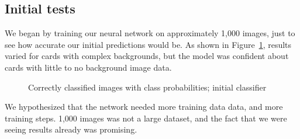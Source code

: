 \documentclass[letterpaper]{article}
\begin{document}
\subsection{Initial tests}
We began by training our neural network on approximately 1,000 images, just to see how accurate our initial predictions would be. As shown in Figure~\ref{fig:initial_results_1}, results varied for cards with complex backgrounds, but the model was confident about cards with little to no background image data. 
\begin{figure}[!tbp]
  \centering

  \caption{\label{fig:initial_results_1} Correctly classified images with class probabilities; initial classifier}
\end{figure}


We hypothesized that the network needed more training data data, and more training steps. 1,000 images was not a large dataset, and the fact that we were seeing results already was promising.
\end{document}
